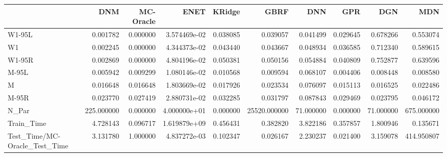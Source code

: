\begin{tabular}{lrrrrrrrrr}
\toprule
{} &         DNM &  MC-Oracle &          ENET &    KRidge &          GBRF &        DNN &       GPR &        DGN &         MDN \\
\midrule
W1-95L                        &    0.001782 &   0.000000 &  3.574469e-02 &  0.038085 &      0.039057 &   0.041499 &  0.029645 &   0.678266 &    0.553074 \\
W1                            &    0.002245 &   0.000000 &  4.344373e-02 &  0.043440 &      0.043667 &   0.048934 &  0.036585 &   0.712340 &    0.589615 \\
W1-95R                        &    0.002869 &   0.000000 &  4.804196e-02 &  0.050381 &      0.050156 &   0.054884 &  0.040809 &   0.752877 &    0.639596 \\
M-95L                         &    0.005942 &   0.009299 &  1.080146e-02 &  0.010568 &      0.009594 &   0.068107 &  0.004406 &   0.008448 &    0.008580 \\
M                             &    0.016648 &   0.016648 &  1.803669e-02 &  0.017926 &      0.023534 &   0.076097 &  0.015113 &   0.016525 &    0.022486 \\
M-95R                         &    0.023770 &   0.027419 &  2.880731e-02 &  0.032285 &      0.031797 &   0.087843 &  0.029469 &   0.023795 &    0.046172 \\
N\_Par                         &  225.000000 &   0.000000 &  4.000000e+01 &  0.000000 &  25520.000000 &  71.000000 &  0.000000 &  71.000000 &  675.000000 \\
Train\_Time                    &    4.728143 &   0.096717 &  1.619879e+09 &  0.456431 &      0.382820 &   3.822186 &  0.357857 &   1.800946 &    0.135671 \\
Test\_Time/MC-Oracle\_Test\_Time &    3.131780 &   1.000000 &  4.837272e-03 &  0.102347 &      0.026167 &   2.230237 &  0.021400 &   3.159078 &  414.950807 \\
\bottomrule
\end{tabular}
